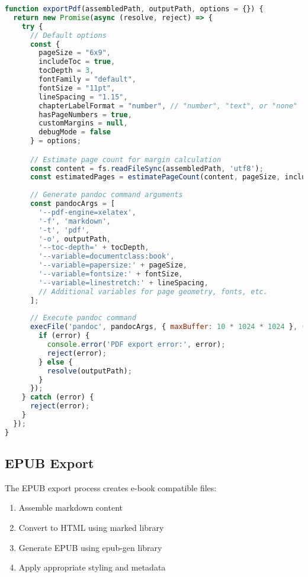 \documentclass[12pt,a4paper]{book}
\begin{document}
\begin{lstlisting}[language=JavaScript, caption=PDF Export Function]
function exportPdf(assembledPath, outputPath, options = {}) {
  return new Promise(async (resolve, reject) => {
    try {
      // Default options
      const {
        pageSize = "6x9",
        includeToc = true,
        tocDepth = 3,
        fontFamily = "default",
        fontSize = "11pt",
        lineSpacing = "1.15",
        chapterLabelFormat = "number", // "number", "text", or "none"
        hasPageNumbers = true,
        customMargins = null,
        debugMode = false
      } = options;

      // Estimate page count for margin calculation
      const content = fs.readFileSync(assembledPath, 'utf8');
      const estimatedPages = estimatePageCount(content, pageSize, includeToc);
      
      // Generate pandoc command arguments
      const pandocArgs = [
        '--pdf-engine=xelatex',
        '-f', 'markdown',
        '-t', 'pdf',
        '-o', outputPath,
        '--toc-depth=' + tocDepth,
        '--variable=documentclass:book',
        '--variable=papersize:' + pageSize,
        '--variable=fontsize:' + fontSize,
        '--variable=linestretch:' + lineSpacing,
        // Additional variables for page geometry, fonts, etc.
      ];
      
      // Execute pandoc command
      execFile('pandoc', pandocArgs, { maxBuffer: 10 * 1024 * 1024 }, (error, stdout, stderr) => {
        if (error) {
          console.error('PDF export error:', error);
          reject(error);
        } else {
          resolve(outputPath);
        }
      });
    } catch (error) {
      reject(error);
    }
  });
}
\end{lstlisting}

\subsection{EPUB Export}

The EPUB export process creates e-book compatible files:

\begin{enumerate}
  \item Assemble markdown content
  \item Convert to HTML using marked library
  \item Generate EPUB using epub-gen library
  \item Apply appropriate styling and metadata
\end{enumerate}
\end{document}
